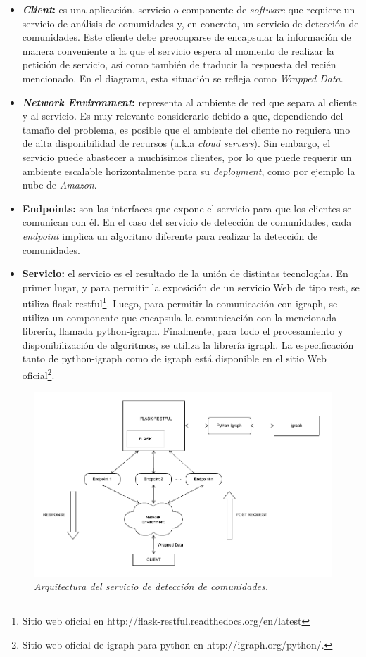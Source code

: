 \begin{itemize}
  \item \textbf{\textit{Client}:} es una aplicación, servicio o componente de \textit{software} que requiere un servicio de análisis de comunidades y, en concreto, un servicio de detección de comunidades. Este cliente debe preocuparse de encapsular la información de manera conveniente a la que el servicio espera al momento de realizar la petición de servicio, así como también de traducir la respuesta del recién mencionado. En el diagrama, esta situación se refleja como \textit{Wrapped Data}.
  \item \textbf{\textit{Network Environment}:} representa al ambiente de red que separa al cliente y al servicio. Es muy relevante considerarlo debido a que, dependiendo del tamaño del problema, es posible que el ambiente del cliente no requiera uno de alta disponibilidad de recursos (a.k.a \textit{cloud servers}). Sin embargo, el servicio puede abastecer a muchísimos clientes, por lo que puede requerir un ambiente escalable horizontalmente para su \textit{deployment}, como por ejemplo la nube de \textit{Amazon}.
  \item \textbf{Endpoints:} son las interfaces que expone el servicio para que los clientes se comunican con él. En el caso del servicio de detección de comunidades, cada \textit{endpoint} implica un algoritmo diferente para realizar la detección de comunidades.
  \item \textbf{Servicio:} el servicio es el resultado de la unión de distintas tecnologías. En primer lugar, y para permitir la exposición de un servicio Web de tipo rest, se utiliza flask-restful\footnote{Sitio web oficial en http://flask-restful.readthedocs.org/en/latest}. Luego, para permitir la comunicación con igraph, se utiliza un componente que encapsula la comunicación con la mencionada librería, llamada python-igraph. Finalmente, para todo el procesamiento y disponibilización de algoritmos, se utiliza la librería igraph. La especificación tanto de python-igraph como de igraph está disponible en el sitio Web oficial\footnote{Sitio web oficial de igraph para python en http://igraph.org/python/.}.
\end{itemize}

\begin{figure}
  \centering
  \includegraphics[scale=.5]{images/Figura3-1}
  \caption{\em Arquitectura del servicio de detección de comunidades.}
  \label{fig:serv-im1}
\end{figure}

